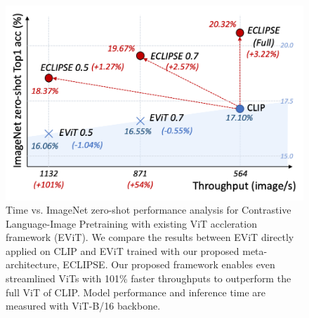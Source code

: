 \begin{figure}[t]
    \centering
    \includegraphics[width=0.9\columnwidth]{figures/imgs/figure_speed.png}
    \caption{Time vs. ImageNet zero-shot performance analysis for Contrastive Language-Image Pretraining with existing ViT accleration framework (EViT).
    We compare the results between EViT directly applied on CLIP and EViT trained with our proposed meta-architecture, ECLIPSE.
    Our proposed framework enables even streamlined ViTs with 101\% faster throughputs to outperform the full ViT of CLIP.
    Model performance and inference time are measured with ViT-B/16 backbone.
    }
    \label{fig:fig_speed}
\end{figure}